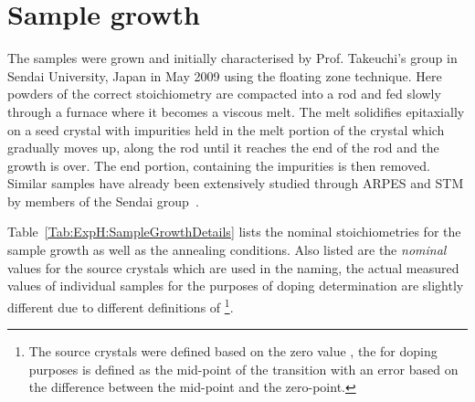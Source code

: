 
\section{Sample growth}

The samples were grown and initially characterised by Prof. Takeuchi's group in Sendai University, Japan in May 2009 using the floating zone technique. Here powders of the correct stoichiometry are compacted into a rod and fed slowly through a furnace where it becomes a viscous melt. The melt solidifies epitaxially on a seed crystal with impurities held in the melt portion of the crystal which gradually moves up, along the rod until it reaches the end of the rod and the growth is over. The end portion, containing the impurities is then removed. Similar samples have already been extensively studied through \ac{ARPES} and \ac{STM} by members of the Sendai group~\cite{Wise2009, Wise2008, Kondo2007, Kondo2005, Kondo2010, Kondo2009, Kondo2006, Kondo2007}.

Table~\ref{Tab:ExpH:SampleGrowthDetails} lists the nominal stoichiometries for the sample growth as well as the annealing conditions. Also listed are the \emph{nominal} \Tc values for the source crystals which are used in the naming, the actual measured \Tc values of individual samples for the purposes of doping determination are slightly different due to different definitions of \Tc\footnote{The source crystals were defined based on the zero value \Tc, the \Tc for doping purposes is defined as the mid-point of the transition with an error based on the difference between the mid-point and the zero-point.}.

